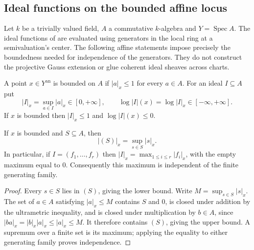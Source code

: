 \subsection{Ideal functions on the bounded affine locus}
\label{subsec:ideal-functions}

Let $k$ be a trivially valued field, $A$ a commutative $k$-algebra and
$Y=\operatorname{Spec} A$. The ideal functions of
\cite[\S2.1]{FHX} are evaluated using generators in the local ring at a
semivaluation's center. The following affine statements impose precisely the
boundedness needed for independence of the generators. They do not construct
the projective Gauss extension or glue coherent ideal sheaves across charts.

\begin{definition}
\label{def:bounded-ideal-norm}
\leanok
{}
A point $x\in Y^{\mathrm{an}}$ is bounded on $A$ if $|a|_x\le1$ for every
$a\in A$. For an ideal $I\subseteq A$ put
\[
 |I|_x=\sup_{a\in I}|a|_x\in[0,+\infty],\qquad
 \log|I|(x)=\log |I|_x\in[-\infty,+\infty].
\]
If $x$ is bounded then $|I|_x\le1$ and $\log|I|(x)\le0$.
\end{definition}

\begin{lemma}
\label{lem:ideal-norm-span}
\leanok
{}
If $x$ is bounded and $S\subseteq A$, then
\[
 |(S)|_x=\sup_{s\in S}|s|_x.
\]
In particular, if $I=(f_1,\ldots,f_r)$ then
$|I|_x=\max_{1\le i\le r}|f_i|_x$, with the empty maximum equal to $0$.
Consequently this maximum is independent of the finite generating family.
\end{lemma}
\begin{proof}
Every $s\in S$ lies in $(S)$, giving the lower bound. Write
$M=\sup_{s\in S}|s|_x$. The set of $a\in A$ satisfying $|a|_x\le M$
contains $S$ and $0$, is closed under addition by the ultrametric inequality,
and is closed under multiplication by $b\in A$, since
$|ba|_x=|b|_x|a|_x\le|a|_x\le M$. It therefore contains $(S)$,
giving the upper bound. A supremum over a finite set is its maximum;
applying the equality to either generating family proves independence.
\end{proof}

